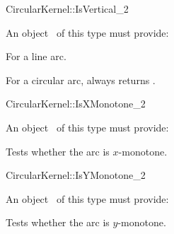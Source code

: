 \begin{ccRefFunctionObjectConcept}{CircularKernel::IsVertical_2}


An object \ccVar\ of this type must provide:

{For a line arc.}

{For a circular arc,  always returns .}

\ccHasModels


\ccSeeAlso


\end{ccRefFunctionObjectConcept}

\begin{ccRefFunctionObjectConcept}{CircularKernel::IsXMonotone_2}


An object \ccVar\ of this type must provide:

{Tests whether the arc is $x$-monotone.}

\ccHasModels


\ccSeeAlso


\end{ccRefFunctionObjectConcept}

\begin{ccRefFunctionObjectConcept}{CircularKernel::IsYMonotone_2}


An object \ccVar\ of this type must provide:

{Tests whether the arc is $y$-monotone.}

\ccHasModels


\ccSeeAlso


\end{ccRefFunctionObjectConcept}
